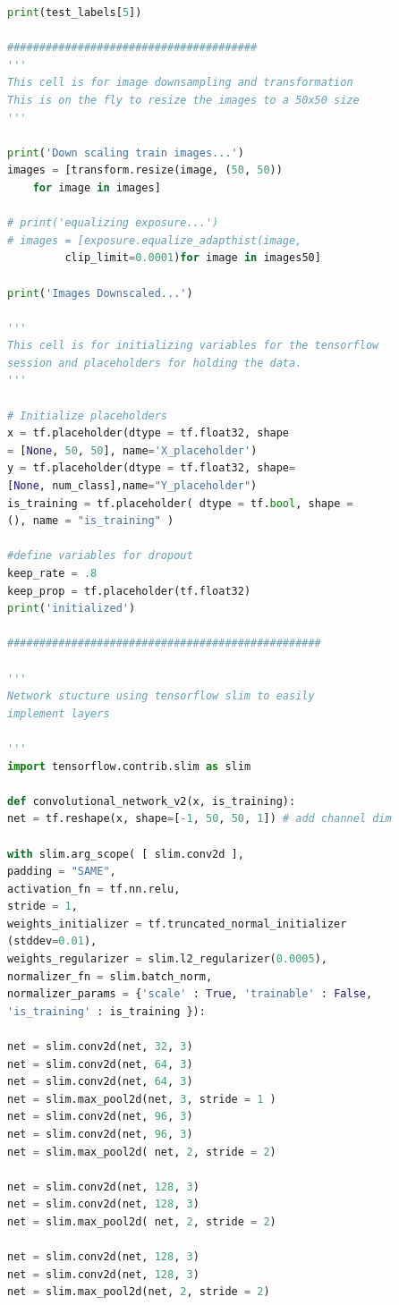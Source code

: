\begin{lstlisting}[language=python, frame=single]
print(test_labels[5])

#######################################
'''
This cell is for image downsampling and transformation
This is on the fly to resize the images to a 50x50 size
'''

print('Down scaling train images...')
images = [transform.resize(image, (50, 50)) 
	for image in images]

# print('equalizing exposure...')
# images = [exposure.equalize_adapthist(image,
		 clip_limit=0.0001)for image in images50]

print('Images Downscaled...')

'''
This cell is for initializing variables for the tensorflow 
session and placeholders for holding the data.
'''

# Initialize placeholders 
x = tf.placeholder(dtype = tf.float32, shape 
= [None, 50, 50], name='X_placeholder')
y = tf.placeholder(dtype = tf.float32, shape= 
[None, num_class],name="Y_placeholder")
is_training = tf.placeholder( dtype = tf.bool, shape = 
(), name = "is_training" )

#define variables for dropout
keep_rate = .8
keep_prop = tf.placeholder(tf.float32)
print('initialized')

#################################################

'''
Network stucture using tensorflow slim to easily 
implement layers 

'''
import tensorflow.contrib.slim as slim

def convolutional_network_v2(x, is_training):
net = tf.reshape(x, shape=[-1, 50, 50, 1]) # add channel dim

with slim.arg_scope( [ slim.conv2d ],
padding = "SAME",
activation_fn = tf.nn.relu,
stride = 1,
weights_initializer = tf.truncated_normal_initializer
(stddev=0.01),
weights_regularizer = slim.l2_regularizer(0.0005),
normalizer_fn = slim.batch_norm,
normalizer_params = {'scale' : True, 'trainable' : False, 
'is_training' : is_training }):

net = slim.conv2d(net, 32, 3)
net = slim.conv2d(net, 64, 3)
net = slim.conv2d(net, 64, 3)
net = slim.max_pool2d(net, 3, stride = 1 )
net = slim.conv2d(net, 96, 3)
net = slim.conv2d(net, 96, 3)
net = slim.max_pool2d( net, 2, stride = 2)

net = slim.conv2d(net, 128, 3)
net = slim.conv2d(net, 128, 3)
net = slim.max_pool2d( net, 2, stride = 2)

net = slim.conv2d(net, 128, 3)
net = slim.conv2d(net, 128, 3)
net = slim.max_pool2d(net, 2, stride = 2)


\end{lstlisting}
